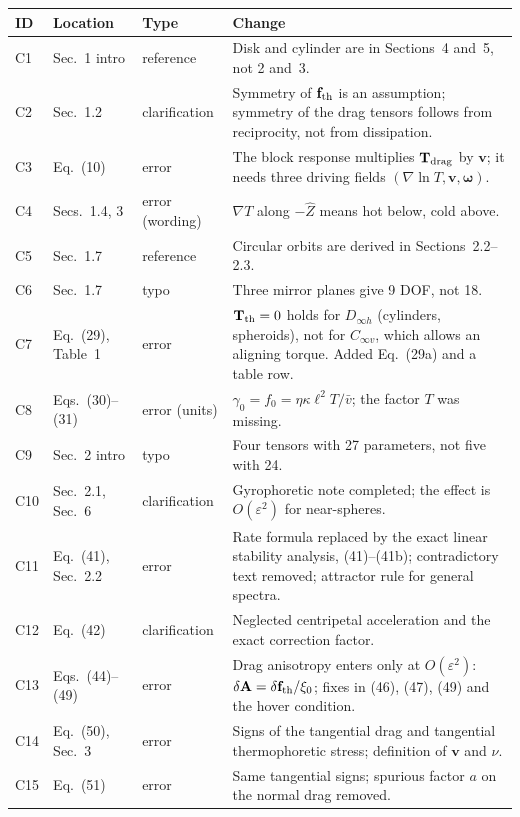 \documentclass[11pt]{article}
\newcommand{\vect}[1]{\bm{#1}}
\begin{document}
\begin{center}
\small
\begin{longtable}{@{}l p{2.6cm} p{2.0cm} p{8.1cm}@{}}
\toprule
ID & Location & Type & Change\\
\midrule
\endhead
C1 & Sec.~1 intro & reference & Disk and cylinder are in Sections~4 and~5, not 2 and~3.\\
C2 & Sec.~1.2 & clarification & Symmetry of $\mathbf f_{\rm th}$ is an assumption; symmetry of the drag tensors follows from reciprocity, not from dissipation.\\
C3 & Eq.~(10) & error & The block response multiplies $\mathbf T_{\rm drag}$ by $\vect v$; it needs three driving fields $(\nabla\ln T,\vect v,\vect\omega)$.\\
C4 & Secs.~1.4, 3 & error (wording) & $\nabla T$ along $-\hat Z$ means hot below, cold above.\\
C5 & Sec.~1.7 & reference & Circular orbits are derived in Sections~2.2--2.3.\\
C6 & Sec.~1.7 & typo & Three mirror planes give 9 DOF, not 18.\\
C7 & Eq.~(29), Table~1 & error & $\mathbf T_{\rm th}=0$ holds for $D_{\infty h}$ (cylinders, spheroids), not for $C_{\infty v}$, which allows an aligning torque. Added Eq.~(29a) and a table row.\\
C8 & Eqs.~(30)--(31) & error (units) & $\gamma_0=f_0=\eta\kappa\ell^2T/\bar v$; the factor $T$ was missing.\\
C9 & Sec.~2 intro & typo & Four tensors with 27 parameters, not five with 24.\\
C10 & Sec.~2.1, Sec.~6 & clarification & Gyrophoretic note completed; the effect is $O(\varepsilon^2)$ for near-spheres.\\
C11 & Eq.~(41), Sec.~2.2 & error & Rate formula replaced by the exact linear stability analysis, (41)--(41b); contradictory text removed; attractor rule for general spectra.\\
C12 & Eq.~(42) & clarification & Neglected centripetal acceleration and the exact correction factor.\\
C13 & Eqs.~(44)--(49) & error & Drag anisotropy enters only at $O(\varepsilon^2)$: $\delta\mathbf A=\delta\mathbf f_{\rm th}/\xi_0$; fixes in (46), (47), (49) and the hover condition.\\
C14 & Eq.~(50), Sec.~3 & error & Signs of the tangential drag and tangential thermophoretic stress; definition of $\vect v$ and $\nu$.\\
C15 & Eq.~(51) & error & Same tangential signs; spurious factor $a$ on the normal drag removed.\\

\end{longtable}
\end{center}
\end{document}
